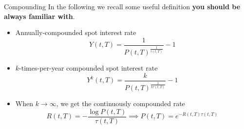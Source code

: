 \documentclass{beamer}
\begin{document}
\begin{frame}{Compounding}
	In the following we recall some useful definition \textbf{you should be always familiar with}.
	\begin{itemize}
		\item Annually-compounded spot interest rate
		\begin{equation*}
			Y(t, T)= \frac{1}{P(t, T)^{\frac{1}{\tau(t,T)}}}-1
		\end{equation*}
		\item $k$-times-per-year compounded spot interest rate
		\begin{equation*}
			Y^k(t, T)= \frac{k}{P(t, T)^{\frac{1}{k\tau(t,T)}}}-1
		\end{equation*}
		\item When $k\rightarrow\infty$, we get the continuously compounded rate
		\begin{equation*}
			R(t,T)=-\frac{\log P(t,T)}{\tau(t,T)} \implies P(t,T)=e^{-R(t,T)\tau(t,T)}
		\end{equation*}
	\end{itemize}
\end{frame}
\end{document}
